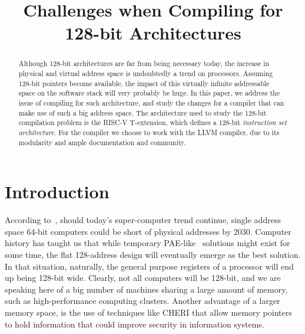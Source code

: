 \documentclass[a4paper,conference]{IEEEtran}
\newcommand{\riscv}{\textsc{\small RISC-V}\xspace}
\begin{document}
\title{Challenges when Compiling for 128-bit Architectures}

\author{\IEEEauthorblockN{~\thanks{~}}
\IEEEauthorblockA{}}


\author{
}

\maketitle
\thispagestyle{empty}
\pagestyle{empty}

\begin{abstract}
Although 128-bit architectures are far from being necessary today, the increase in physical and virtual address space is undoubtedly a trend on processors.
Assuming 128-bit pointers become available, the impact of this virtually infinite addressable space on the software stack will very probably be huge.
In this paper, we address the issue of compiling for such architecture, and study the changes for a compiler that can make use of such a big address space.
The architecture used to study the 128-bit compilation problem is the \riscv T-extension, which defines a 128-bit \emph{instruction set architecture}. For the compiler we choose to work with the LLVM compiler, due to its modularity and ample documentation and community.
\end{abstract}

\section{Introduction}
According to~\cite[Chapter 7]{waterman2014risc}, should today's super-computer trend continue, single address space 64-bit computers could be short of physical addresses by 2030.
Computer history has taught us that while temporary PAE-like~\cite{collins1996paging} solutions might exist for some time, the flat 128-address design will eventually emerge as the best solution.
In that situation, naturally, the general purpose registers of a processor will end up being 128-bit wide.
Clearly, not all computers will be 128-bit, and we are speaking here of a big number of machines sharing a large amount of memory, such as high-performance computing clusters.
Another advantage of a larger memory space, is the use of techniques like CHERI that allow memory pointers to hold information that could improve security in information systems. 
\end{document}
